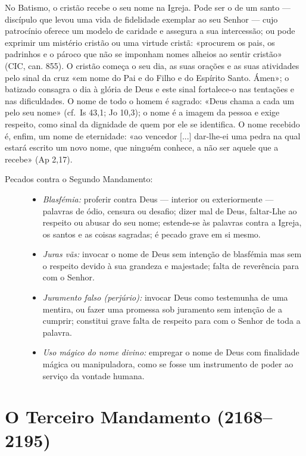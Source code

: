 No Batismo, o cristão recebe o seu nome na Igreja. Pode ser o de um santo --- discípulo que levou uma vida de fidelidade exemplar ao seu Senhor --- cujo patrocínio oferece um modelo de caridade e assegura a sua intercessão; ou pode exprimir um mistério cristão ou uma virtude cristã: «procurem os pais, os padrinhos e o pároco que não se imponham nomes alheios ao sentir cristão» (CIC, can. 855). O cristão começa o seu dia, as suas orações e as suas atividades pelo sinal da cruz «em nome do Pai e do Filho e do Espírito Santo. Ámen»; o batizado consagra o dia à glória de Deus e este sinal fortalece-o nas tentações e nas dificuldades. O nome de todo o homem é sagrado: «Deus chama a cada um pelo seu nome» (cf.~Is 43,1; Jo 10,3); o nome é a imagem da pessoa e exige respeito, como sinal da dignidade de quem por ele se identifica. O nome recebido é, enfim, um nome de eternidade: «ao vencedor [...] dar-lhe-ei uma pedra na qual estará escrito um novo nome, que ninguém conhece, a não ser aquele que a recebe» (Ap 2,17).

\begin{description}

    \item[Pecados contra o Segundo Mandamento:]
          \begin{itemize}
              \item \textit{Blasfémia:} proferir contra Deus --- interior ou exteriormente --- palavras de ódio, censura ou desafio; dizer mal de Deus, faltar-Lhe ao respeito ou abusar do seu nome; estende-se às palavras contra a Igreja, os santos e as coisas sagradas; é pecado grave em si mesmo.
              \item \textit{Juras vãs:} invocar o nome de Deus sem intenção de blasfémia mas sem o respeito devido à sua grandeza e majestade; falta de reverência para com o Senhor.
              \item \textit{Juramento falso (perjúrio):} invocar Deus como testemunha de uma mentira, ou fazer uma promessa sob juramento sem intenção de a cumprir; constitui grave falta de respeito para com o Senhor de toda a palavra.
              \item \textit{Uso mágico do nome divino:} empregar o nome de Deus com finalidade mágica ou manipuladora, como se fosse um instrumento de poder ao serviço da vontade humana.
          \end{itemize}

\end{description}

\section{O Terceiro Mandamento (2168--2195)}

